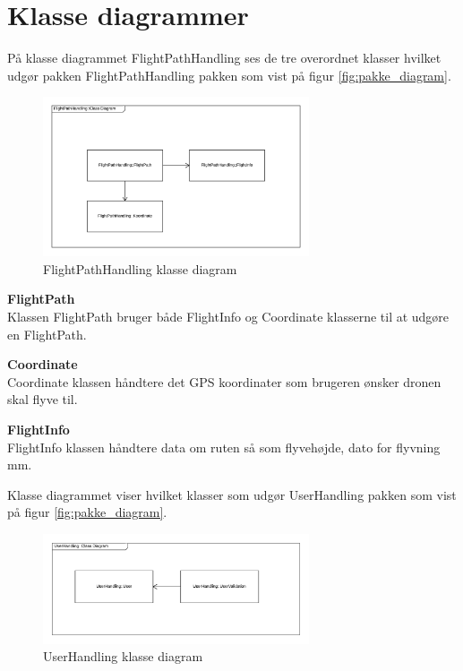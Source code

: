 \section{Klasse diagrammer}

På klasse diagrammet FlightPathHandling ses de tre overordnet klasser hvilket udgør pakken FlightPathHandling pakken som vist på figur \ref{fig:pakke_diagram}.

\vspace{-5pt}
\begin{figure}[H]
	\centering
	\includegraphics[width=0.7\textwidth]{Billeder/klasse_diagrammer/FlightPathHandlingDiagram.png}
	\vspace{-5pt}
	\caption{FlightPathHandling klasse diagram}
	\label{fig:FlightPathHandling_klasse_diagram}
\end{figure}

\textbf{FlightPath}\\
Klassen FlightPath bruger både FlightInfo og Coordinate klasserne til at udgøre en FlightPath.

\textbf{Coordinate}\\
Coordinate klassen håndtere det GPS koordinater som brugeren ønsker dronen skal flyve til.

\textbf{FlightInfo}\\
FlightInfo klassen håndtere data om ruten så som flyvehøjde, dato for flyvning mm. 

\newpage
Klasse diagrammet viser hvilket klasser som udgør UserHandling pakken som vist på figur \ref{fig:pakke_diagram}.

\vspace{-5pt}
\begin{figure}[H]
	\centering
	\includegraphics[width=0.7\textwidth]{Billeder/klasse_diagrammer/UserHandlingDiagram.png}
	\vspace{-5pt}
	\caption{UserHandling klasse diagram}
	\label{fig:UserHandling_klasse_diagram}
\end{figure}

